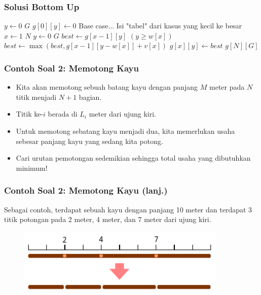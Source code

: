 \begin{frame}
\frametitle{Solusi Bottom Up}
\begin{codebox}
\li \For $y \gets 0$ \To $G$ \Do
\li   $g[0][y] \gets 0$ \Comment Base case...
    \End
\zi
\li \Comment Isi "tabel" dari kasus yang kecil ke besar
\li \For $x \gets 1$ \To $N$ \Do
\li   \For $y \gets 0$ \To $G$ \Do
\li     $best \gets g[x-1][y]$
\li     \If $(y \geq w[x])$ \Then
\li       $best \gets \max(best, g[x - 1][y-w[x]] + v[x])$
        \End  
\li     $g[x][y] \gets best$
      \End
    \End    
\li \Return $g[N][G]$
    \End
\end{codebox}
\end{frame}

\begin{frame}
\frametitle{Contoh Soal 2: Memotong Kayu}
\begin{itemize}
  \item Kita akan memotong sebuah batang kayu dengan panjang $M$ meter pada $N$ titik menjadi $N+1$ bagian.
  \item Titik ke-$i$ berada di $L_i$ meter dari ujung kiri.
  \item Untuk memotong sebatang kayu menjadi dua, kita memerlukan usaha \alert{sebesar panjang kayu yang sedang kita potong}.
  \item Cari urutan pemotongan sedemikian sehingga total usaha yang dibutuhkan minimum!
\end{itemize}
\end{frame}

\begin{frame}
\frametitle{Contoh Soal 2: Memotong Kayu (lanj.)}
Sebagai contoh, terdapat sebuah kayu dengan panjang 10 meter dan terdapat 3 titik potongan pada 2 meter, 4 meter, dan 7 meter dari ujung kiri.
\begin{figure}
  \includegraphics[width=10cm]{asset/cutting-stick-1.pdf}
\end{figure}
\end{frame}

